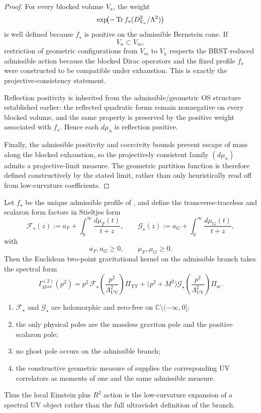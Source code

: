 \begin{proof}
For every blocked volume $V_n$, the weight
\[
\exp\!\bigl(-\operatorname{Tr} f_\star(D_{V_n}^2/\Lambda^2)\bigr)
\]
is well defined because $f_\star$ is positive on the admissible Bernstein cone. If
\[
V_n\subset V_m,
\]
restriction of geometric configurations from $V_m$ to $V_n$ respects the BRST-reduced admissible
action because the blocked Dirac operators and the fixed profile $f_\star$ were constructed to be
compatible under exhaustion. This is exactly the projective-consistency statement.

Reflection positivity is inherited from the admissible/geometric OS structure established earlier:
the reflected quadratic forms remain nonnegative on every blocked volume, and the same property is
preserved by the positive weight associated with $f_\star$. Hence each $d\mu_n$ is reflection
positive.

Finally, the admissible positivity and coercivity bounds prevent escape of mass along the blocked
exhaustion, so the projectively consistent family $(d\mu_n)$ admits a projective-limit measure. The
geometric partition function is therefore defined constructively by the stated limit, rather than
only heuristically read off from low-curvature coefficients.
\end{proof}

\begin{theorem}
\label{thm:spectral-uv-completion}
Let $f_\star$ be the unique admissible profile of , and define
the transverse-traceless and scalaron form factors in Stieltjes form
\[
\mathcal F_\star(z)
:=
a_F+\int_0^\infty \frac{d\mu_F(t)}{t+z},
\qquad
\mathcal G_\star(z)
:=
a_G+\int_0^\infty \frac{d\mu_G(t)}{t+z},
\]
with
\[
a_F,a_G\ge 0,
\qquad
\mu_F,\mu_G\ge 0.
\]
Then the Euclidean two-point gravitational kernel on the admissible branch takes the spectral form
\[
\Gamma_{\mathrm{grav}}^{(2)}(p^2)
=
p^2\,\mathcal F_\star\!\left(\frac{p^2}{\Lambda_{\mathrm{UV}}^2}\right)\Pi_{\mathrm{TT}}
+
\bigl(p^2+M^2\bigr)\mathcal G_\star\!\left(\frac{p^2}{\Lambda_{\mathrm{UV}}^2}\right)\Pi_{\mathrm{sc}}.
\]
\begin{enumerate}[label=(\roman*), leftmargin=1.5em, topsep=3pt, itemsep=2pt]
    \item $\mathcal F_\star$ and $\mathcal G_\star$ are holomorphic and zero-free on
    $\mathbb C\setminus(-\infty,0]$;
    \item the only physical poles are the massless graviton pole and the positive scalaron pole;
    \item no ghost pole occurs on the admissible branch;
    \item the constructive geometric measure of  supplies the
    corresponding UV correlators as moments of one and the same admissible measure.
\end{enumerate}
Thus the local Einstein plus $R^2$ action is the low-curvature expansion of a spectral UV object
rather than the full ultraviolet definition of the branch.
\end{theorem}

